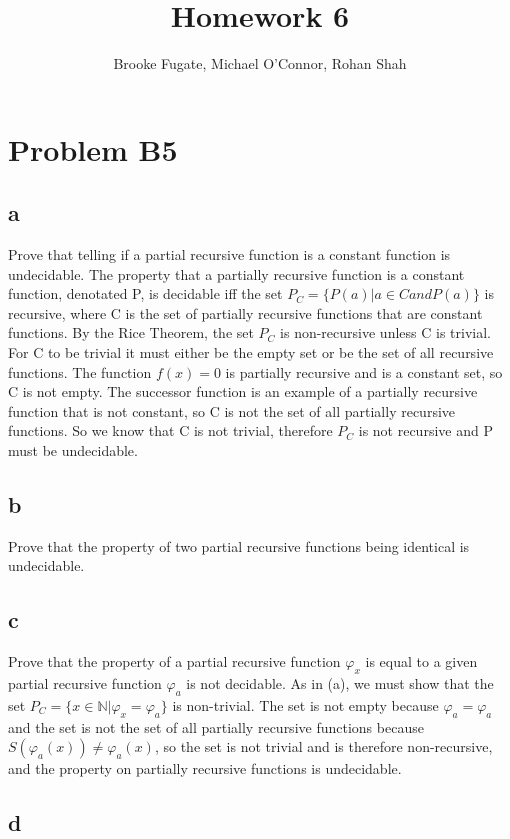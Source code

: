 \documentclass[12pt]{article}
\begin{document}
\pagestyle{plain}
\titleformat{\subsection}[runin]
  {\normalfont\large\bfseries}{\thesubsection}{1em}{}
\titleformat{\subsubsection}[runin]
  {\bfseries}{}{1em}{}

\title{Homework 6}
\author{Brooke Fugate, Michael O'Connor, Rohan Shah}
\date{}

\maketitle

\section*{Problem B5}
\subsection*{a}
Prove that telling if a partial recursive function is a constant function is undecidable.  The property that a partially recursive function is a constant function, denotated P, is decidable iff the set $P_C = \{P(a)|a \in C and P(a)\}$ is recursive, where C is the set of partially recursive functions that are constant functions. By the Rice Theorem, the set $P_C$ is non-recursive unless C is trivial.  For C to be trivial it must either be the empty set or be the set of all recursive functions. The function $f(x)=0$ is partially recursive and is a constant set, so C is not empty.  The successor function is an example of a partially recursive function that is not constant, so C is not the set of all partially recursive functions.  So we know that C is not trivial, therefore $P_C$ is not recursive and P must be undecidable. 
\subsection*{b} 
Prove that the property of two partial recursive functions being identical is undecidable.
\subsection*{c} 
Prove that the property of a partial recursive function $\varphi_x$ is equal to a given partial recursive function $\varphi_a$ is not decidable.  As in (a), we must show that the set $P_C = \{x \in \mathbb{N} | \varphi_x = \varphi_a \}$ is non-trivial.  The set is not empty because $\varphi_a = \varphi_a$ and the set is not the set of all partially recursive functions because $S (\varphi_a(x)) \neq \varphi_a(x)$, so the set is not trivial and is therefore non-recursive, and the property on partially recursive functions is undecidable.  
\subsection*{d}
\end{document}
